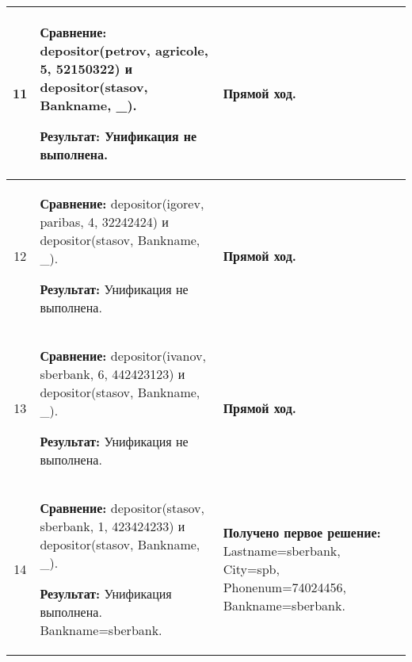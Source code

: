 \begin{longtable}{|c|p{}|p{}|}
    11
                       &
\textbf{Сравнение:} \newline
  depositor(petrov, agricole, 5, 52150322)
    \newline и \newline
    depositor(stasov, Bankname, \_).
    \newline

    \textbf{Результат:} \newline
    Унификация не выполнена.
                       &
    \textbf{Прямой ход.}
                       \\ \hline

    12
                       &
\textbf{Сравнение:} \newline
  depositor(igorev, paribas,  4, 32242424)
    \newline и \newline
    depositor(stasov, Bankname, \_).
    \newline

    \textbf{Результат:} \newline
    Унификация не выполнена.
                       &
    \textbf{Прямой ход.}
                       \\ \hline

    13
                       &
\textbf{Сравнение:} \newline
  depositor(ivanov, sberbank, 6, 442423123)
    \newline и \newline
    depositor(stasov, Bankname, \_).
    \newline

    \textbf{Результат:} \newline
    Унификация не выполнена.
                       &
    \textbf{Прямой ход.}
                       \\ \hline

    14
                       &
\textbf{Сравнение:} \newline
  depositor(stasov, sberbank, 1, 423424233)
    \newline и \newline
    depositor(stasov, Bankname, \_).
    \newline

    \textbf{Результат:} \newline
    Унификация выполнена.\newline{}
    Bankname=sberbank.
                       &
    \textbf{Получено первое решение:}\newline
    Lastname=sberbank, City=spb, Phonenum=74024456, Bankname=sberbank.
    \newline


\end{longtable}
